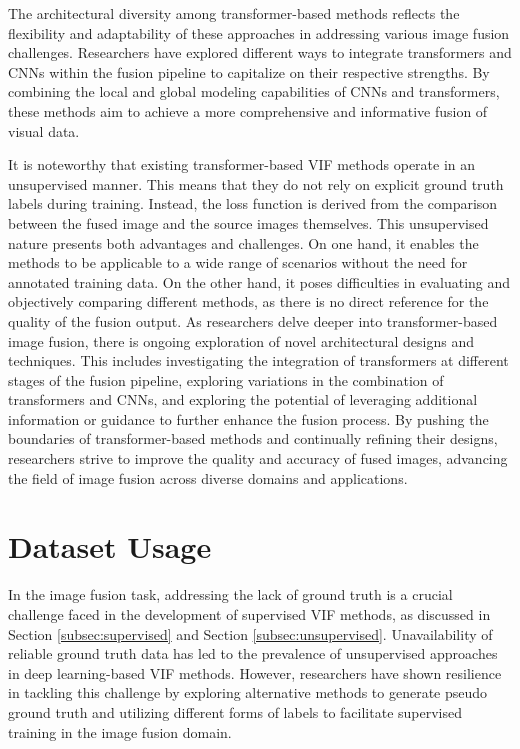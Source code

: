 The architectural diversity among transformer-based methods reflects the flexibility and adaptability of these approaches in addressing various image fusion challenges. Researchers have explored different ways to integrate transformers and CNNs within the fusion pipeline to capitalize on their respective strengths. By combining the local and global modeling capabilities of CNNs and transformers, these methods aim to achieve a more comprehensive and informative fusion of visual data. 

It is noteworthy that existing transformer-based VIF methods operate in an unsupervised manner. This means that they do not rely on explicit ground truth labels during training. Instead, the loss function is derived from the comparison between the fused image and the source images themselves. This unsupervised nature presents both advantages and challenges. On one hand, it enables the methods to be applicable to a wide range of scenarios without the need for annotated training data. On the other hand, it poses difficulties in evaluating and objectively comparing different methods, as there is no direct reference for the quality of the fusion output. As researchers delve deeper into transformer-based image fusion, there is ongoing exploration of novel architectural designs and techniques. This includes investigating the integration of transformers at different stages of the fusion pipeline, exploring variations in the combination of transformers and CNNs, and exploring the potential of leveraging additional information or guidance to further enhance the fusion process. By pushing the boundaries of transformer-based methods and continually refining their designs, researchers strive to improve the quality and accuracy of fused images, advancing the field of image fusion across diverse domains and applications.

\section{Dataset Usage}

In the image fusion task, addressing the lack of ground truth is a crucial challenge faced in the development of supervised VIF methods, as discussed in Section \ref{subsec:supervised} and Section \ref{subsec:unsupervised}. Unavailability of reliable ground truth data has led to the prevalence of unsupervised approaches in deep learning-based VIF methods. However, researchers have shown resilience in tackling this challenge by exploring alternative methods to generate pseudo ground truth and utilizing different forms of labels to facilitate supervised training in the image fusion domain.

